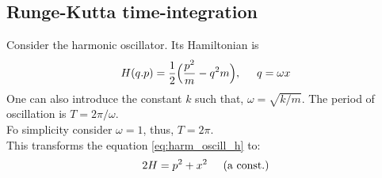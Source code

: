 \documentclass{article}
\begin{document}
\subsection{Runge-Kutta time-integration}

Consider the harmonic oscillator. Its Hamiltonian is
\begin{equation}
	H(q.p) = \frac{1}{2}\Big(\frac{p^2}{m} - q^2m \Big), \hspace{5mm} q = \omega x
	\label{eq:harm_oscill_h}
\end{equation} 
One can also introduce the constant $k$ such that, $\omega = \sqrt{k/m}$. The period of oscillation is $T=2\pi/\omega$. \\
Fo simplicity consider $\omega = 1$, thus, $T=2\pi$. \\
This transforms the equation \ref{eq:harm_oscill_h} to:
%
\begin{equation}
	2H = p^2 + x^2 \hspace{5mm} \text{(a const.)}
\end{equation}
\end{document}
